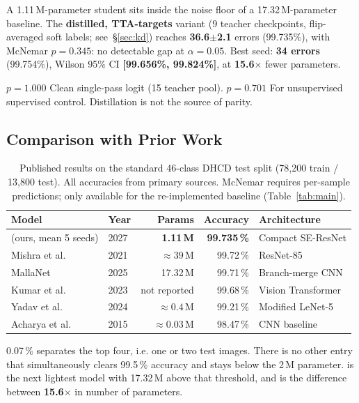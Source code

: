 A 1.11\,M-parameter student sits inside the noise floor of a 17.32\,M-parameter
baseline.  The \textbf{distilled, TTA-targets} variant (9 teacher checkpoints,
flip-averaged soft labels; see~\S\ref{sec:kd}) reaches
\textbf{36.6$\pm$2.1} errors (99.735\%), with McNemar $p = 0.345$: no
detectable gap at $\alpha = 0.05$.  Best seed: \textbf{34 errors} (99.754\%),
Wilson 95\% CI \textbf{[99.656\%, 99.824\%]}, at \textbf{15.6$\times$} fewer
parameters.

$p = 1.000$ Clean single-pass logit (15 teacher pool). $p = 0.701$ For unsupervised supervised control. Distillation is not the source of parity.

\subsection{Comparison with Prior Work}
\label{sec:sota}

\begin{table}[t]\centering
\caption{Published results on the standard 46-class DHCD test split
  (78,200 train / 13,800 test). All accuracies from primary sources.
  McNemar requires per-sample predictions; only available for the
  re-implemented baseline (Table~\ref{tab:main}).}
\label{tab:sota}
\begin{tabular}{llrrl}\toprule
Model & Year & Params & Accuracy & Architecture \\\midrule
\modelname{} (ours, mean 5 seeds) & 2027 & \textbf{1.11\,M} & \textbf{99.735\,\%} & Compact SE-ResNet \\
Mishra et al.~\cite{mishra2021}   & 2021 & ${\approx}39$\,M & 99.72\,\%  & ResNet-85 \\
MallaNet~\cite{malla2025}         & 2025 & 17.32\,M         & 99.71\,\%  & Branch-merge CNN \\
Kumar et al.~\cite{kumar2023vit}  & 2023 & not reported     & 99.68\,\%  & Vision Transformer \\
Yadav et al.~\cite{yadav2024mlcnn}& 2024 & ${\approx}0.4$\,M& 99.21\,\%  & Modified LeNet-5 \\
Acharya et al.~\cite{acharya2015dhcd}& 2015 & ${\approx}0.03$\,M & 98.47\,\% & CNN baseline \\\bottomrule
\end{tabular}\end{table}

0.07\,\% separates the top four, i.e. one or two test images. There is no other entry that simultaneously clears 99.5\,\% accuracy and stays below the 2\,M parameter. \cite{malla2025} is the next lightest model with 17.32\,M above that threshold, and is the difference between \textbf{15.6$\times$} in number of parameters.

